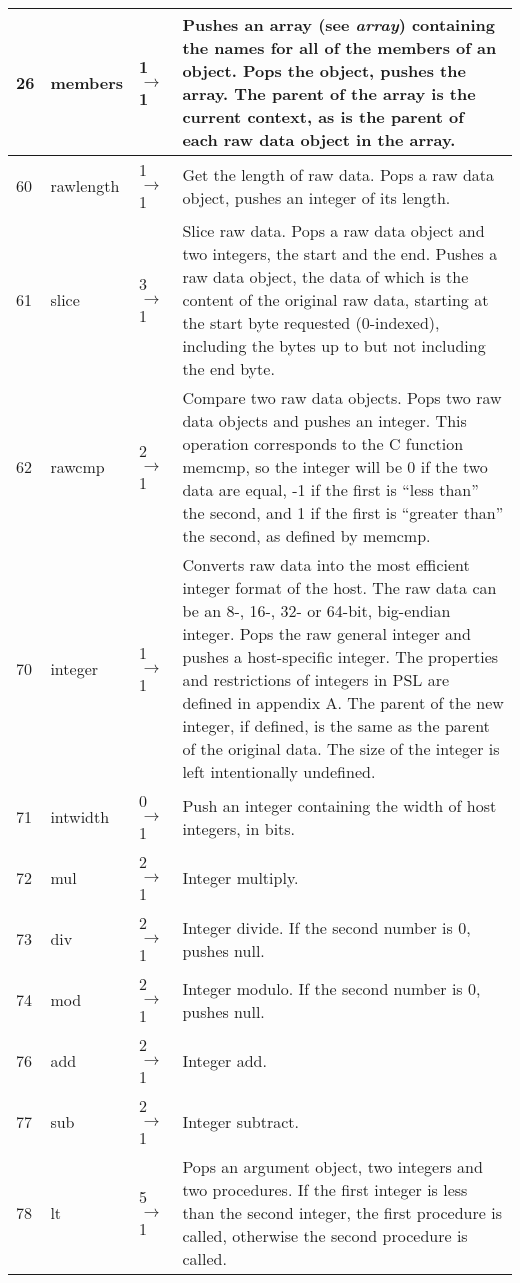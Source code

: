 \begin{longtable}{ | l | l | l | X | }
\hline
26 & members & 1 $\rightarrow$ 1 & Pushes an array (see \textit{array}) containing the names for all of the members of an object. Pops the object, pushes the array. The parent of the array is the current context, as is the parent of each raw data object in the array. \\
\hline
60 & rawlength & 1 $\rightarrow$ 1 & Get the length of raw data. Pops a raw data object, pushes an integer of its length. \\
\hline
61 & slice & 3 $\rightarrow$ 1 & Slice raw data. Pops a raw data object and two integers, the start and the end. Pushes a raw data object, the data of which is the content of the original raw data, starting at the start byte requested (0-indexed), including the bytes up to but not including the end byte. \\
\hline
62 & rawcmp & 2 $\rightarrow$ 1 & Compare two raw data objects. Pops two raw data objects and pushes an integer. This operation corresponds to the C function memcmp, so the integer will be 0 if the two data are equal, -1 if the first is “less than” the second, and 1 if the first is “greater than” the second, as defined by memcmp. \\
\hline
70 & integer & 1 $\rightarrow$ 1 & Converts raw data into the most efficient integer format of the host. The raw data can be an 8-, 16-, 32- or 64-bit, big-endian integer. Pops the raw general integer and pushes a host-specific integer. The properties and restrictions of integers in PSL are defined in appendix A. The parent of the new integer, if defined, is the same as the parent of the original data. The size of the integer is left intentionally undefined. \\
\hline
71 & intwidth & 0 $\rightarrow$ 1 & Push an integer containing the width of host integers, in bits. \\
\hline
72 & mul & 2 $\rightarrow$ 1 & Integer multiply. \\
\hline
73 & div & 2 $\rightarrow$ 1 & Integer divide. If the second number is 0, pushes null. \\
\hline
74 & mod & 2 $\rightarrow$ 1 & Integer modulo. If the second number is 0, pushes null. \\
\hline
76 & add & 2 $\rightarrow$ 1 & Integer add. \\
\hline
77 & sub & 2 $\rightarrow$ 1 & Integer subtract. \\
\hline
78 & lt & 5 $\rightarrow$ 1 & Pops an argument object, two integers and two procedures. If the first integer is less than the second integer, the first procedure is called, otherwise the second procedure is called. \\

\end{longtable}

